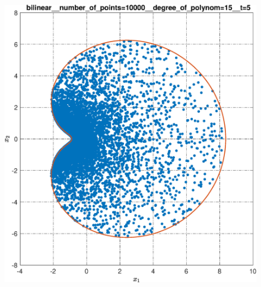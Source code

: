 \documentclass[../main.tex]{subfiles}
\begin{document}
\begin{figure}[ht!]
\begin{minipage}[b]{.3\linewidth}
 	\end{minipage} 
 	\vfill
 	\hspace{-2.5ex}
 	\begin{minipage}[b]{.3\linewidth} 
 		\small
 		\centering 
 		\includegraphics[width=\linewidth]{images/bilinear__number_of_points=10000__degree_of_polynom=15__t=5.eps}
 	\end{minipage}
 	\hfill
 	\begin{minipage}[b]{.3\linewidth} 
 		\small
 		\centering

\end{minipage}
\end{figure}
\end{document}
